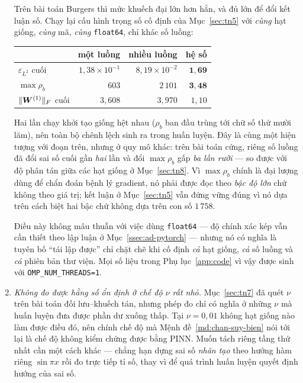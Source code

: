 \begin{enumerate}[label=(\arabic*),leftmargin=2.2em,itemsep=4pt]
Trên bài toán Burgers thì mức khuếch đại lớn hơn hẳn, và đủ lớn để đổi kết luận
số. Chạy lại cấu hình trọng số cố định của Mục~\ref{sec:tn5} với \emph{cùng} hạt
giống, \emph{cùng} mã, \emph{cùng} \texttt{float64}, chỉ khác số luồng:

\begin{center}
\small
\begin{tabular}{@{}l r r r@{}}
\toprule
& một luồng & nhiều luồng & hệ số \\
\midrule
$\varepsilon_{L^2}$ cuối & $1{,}38\times10^{-1}$ & $8{,}19\times10^{-2}$
  & $\mathbf{1{,}69}$ \\
$\max\rho_b$            & $603$                 & $2\,101$
  & $\mathbf{3{,}48}$ \\
$\norm{\bW^{(1)}}_F$ cuối & $3{,}608$           & $3{,}970$ & $1{,}10$ \\
\bottomrule
\end{tabular}
\end{center}

Hai lần chạy khởi tạo giống hệt nhau ($\rho_b$ ban đầu trùng tới chữ số thứ mười
lăm), nên toàn bộ chênh lệch sinh ra trong huấn luyện. Đây là cùng một hiện tượng
với đoạn trên, nhưng ở quy mô khác: trên bài toán cứng, riêng số luồng đã đổi sai
số cuối gần \emph{hai} lần và đổi $\max\rho_b$ gấp \emph{ba lần rưỡi} --- so được
với độ phân tán giữa các hạt giống ở Mục~\ref{sec:tn8}. Vì $\max\rho_b$ chính là
đại lượng dùng để chẩn đoán bệnh lý gradient, nó phải được đọc theo \emph{bậc độ
lớn} chứ không theo giá trị; kết luận ở Mục~\ref{sec:tn5} vẫn đứng vững đúng vì
nó dựa trên cách biệt hai bậc chứ không dựa trên con số $1\,758$.

Điều này không mâu thuẫn với việc dùng \texttt{float64} --- độ chính xác kép vẫn
cần thiết theo lập luận ở Mục~\ref{ssec:ad-pytorch} --- nhưng nó có nghĩa là
tuyên bố ``tái lập được'' chỉ chặt chẽ khi cố định \emph{cả} hạt giống,
\emph{cả} số luồng và \emph{cả} phiên bản thư viện. Mọi số liệu trong
Phụ lục~\ref{app:code} vì vậy được sinh với \texttt{OMP\_NUM\_THREADS=1}.

\item \emph{Không đo được hằng số ổn định ở chế độ $\nu$ rất nhỏ.}
Mục~\ref{sec:tn7} đã quét $\nu$ trên bài toán đối lưu--khuếch tán, nhưng phép đo
chỉ có nghĩa ở những $\nu$ mà huấn luyện đưa được phần dư xuống thấp. Tại
$\nu = 0{,}01$ không hạt giống nào làm được điều đó, nên chính chế độ mà
Mệnh đề~\ref{md:chan-suy-bien} nói tới lại là chế độ không kiểm chứng được bằng
PINN. Muốn tách riêng tầng thứ nhất cần một cách khác --- chẳng hạn dựng sai số
\emph{nhân tạo} theo hướng hàm riêng $\sin\pi x$ rồi đo trực tiếp tỉ số, thay vì
để quá trình huấn luyện quyết định hướng của sai số.


\end{enumerate}
